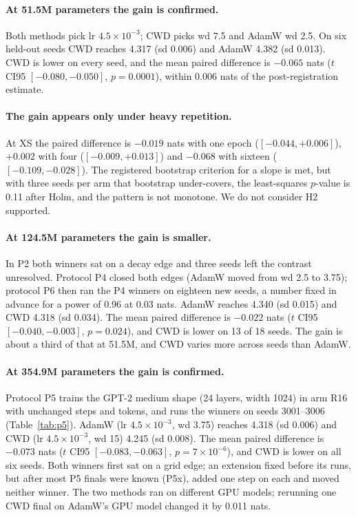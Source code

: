 \documentclass[twoside,11pt]{article}
\begin{document}
\paragraph{At 51.5M parameters the gain is confirmed.} Both methods pick lr $4.5\times10^{-3}$; CWD picks wd 7.5 and AdamW wd 2.5. On six held-out seeds CWD reaches 4.317 (sd 0.006) and AdamW 4.382 (sd 0.013). CWD is lower on every seed, and the mean paired difference is $-0.065$ nats ($t$ CI95 $[-0.080, -0.050]$, $p = 0.0001$), within 0.006 nats of the post-registration estimate.

\paragraph{The gain appears only under heavy repetition.} At XS the paired difference is $-0.019$ nats with one epoch ($[-0.044, +0.006]$), $+0.002$ with four ($[-0.009, +0.013]$) and $-0.068$ with sixteen ($[-0.109, -0.028]$). The registered bootstrap criterion for a slope is met, but with three seeds per arm that bootstrap under-covers, the least-squares $p$-value is 0.11 after Holm, and the pattern is not monotone. We do not consider H2 supported.

\paragraph{At 124.5M parameters the gain is smaller.} In P2 both winners sat on a decay edge and three seeds left the contrast unresolved. Protocol P4 closed both edges (AdamW moved from wd 2.5 to 3.75); protocol P6 then ran the P4 winners on eighteen new seeds, a number fixed in advance for a power of 0.96 at 0.03 nats. AdamW reaches 4.340 (sd 0.015) and CWD 4.318 (sd 0.034). The mean paired difference is $-0.022$ nats ($t$ CI95 $[-0.040, -0.003]$, $p = 0.024$), and CWD is lower on 13 of 18 seeds. The gain is about a third of that at 51.5M, and CWD varies more across seeds than AdamW.

\paragraph{At 354.9M parameters the gain is confirmed.} Protocol P5 trains the GPT-2 medium shape (24 layers, width 1024) in arm R16 with unchanged steps and tokens, and runs the winners on seeds 3001--3006 (Table~\ref{tab:p5}). AdamW (lr $4.5\times10^{-3}$, wd 3.75) reaches 4.318 (sd 0.006) and CWD (lr $4.5\times10^{-3}$, wd 15) 4.245 (sd 0.008). The mean paired difference is $-0.073$ nats ($t$ CI95 $[-0.083, -0.063]$, $p = 7\times10^{-6}$), and CWD is lower on all six seeds. Both winners first sat on a grid edge; an extension fixed before its runs, but after most P5 finals were known (P5x), added one step on each and moved neither winner. The two methods ran on different GPU models; rerunning one CWD final on AdamW's GPU model changed it by 0.011 nats.
\end{document}
